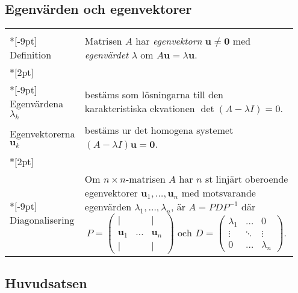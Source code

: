 \documentclass[a4paper]{article}
\def\vec#1{\mathbf #1} %
\begin{document}
\subsection*{Egenvärden och egenvektorer}
\label{subsection*}
\begin{tabular}{|p{0.2\linewidth}|p{0.75\linewidth}|}
  \hline\\*[-9pt]
  Definition&Matrisen $A$ har \emph{egenvektorn} $\vec u\neq\vec0$ med
  \emph{egenvärdet} $\lambda$ om
  $A\vec u=\lambda\vec u$.
  \\*[2pt] \hline\\*[-9pt]
  Egenvärdena $\lambda_k$ 
   & bestäms som lösningarna till den karakteristiska ekvationen 
   $\det(A-\lambda I)=0$.\\
  Egenvektorerna $\vec u_k$& bestäms ur det homogena systemet $(A-\lambda I)\vec u=\mathbf{0}$.
  \\*[2pt] \hline\\*[-9pt]
Diagonalisering&Om $n\times n$-matrisen $A$ har $n$ st linjärt oberoende
egenvektorer $\vec u_1,\dots,\vec u_n$ med motsvarande egenvärden
$\lambda_1,\dots,\lambda_n$, är $A=PDP^{-1}$ där
\vspace{-10pt}
  $$ P=
  \begin{pmatrix}
    |&&|\\
    \vec u_1&\dots&\vec u_n\\
    |&&|
  \end{pmatrix}
  \mbox{ \ och \ \ }
  D = \begin{pmatrix}
    \lambda_1&\dots&0\\
    \vdots&\ddots&\vdots\\
    0&\dots&\lambda_n
  \end{pmatrix}.
  $$
  \vspace{-12pt}
  \\
  \hline
\end{tabular}

\subsection*{Huvudsatsen}
\end{document}
